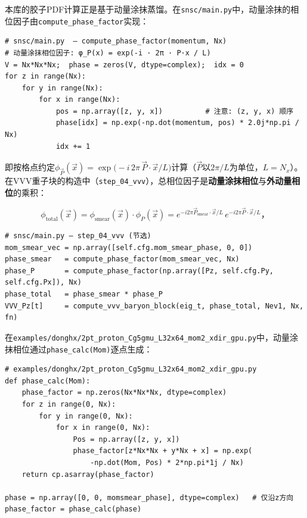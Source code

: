\documentclass[12pt,a4paper]{ctexart}
\theoremstyle{definition}
\begin{document}
本库的胶子PDF计算正是基于动量涂抹蒸馏。在\texttt{snsc/main.py}中，动量涂抹的相位因子由\texttt{compute\_phase\_factor}实现：

\begin{verbatim}
# snsc/main.py  — compute_phase_factor(momentum, Nx)
# 动量涂抹相位因子: φ_P(x) = exp(-i · 2π · P·x / L)
V = Nx*Nx*Nx;  phase = zeros(V, dtype=complex);  idx = 0
for z in range(Nx):
    for y in range(Nx):
        for x in range(Nx):
            pos = np.array([z, y, x])          # 注意: (z, y, x) 顺序
            phase[idx] = np.exp(-np.dot(momentum, pos) * 2.0j*np.pi / Nx)
            idx += 1
\end{verbatim}

即按格点约定$\phi_{\vec{P}}(\vec{x}) = \exp\!\big(-i\,2\pi\,\vec{P}\cdot\vec{x}/L\big)$计算（$\vec{P}$以$2\pi/L$为单位，$L=N_x$）。在VVV重子块的构造中（\texttt{step\_04\_vvv}），总相位因子是\textbf{动量涂抹相位}与\textbf{外动量相位}的乘积：

\begin{equation}
\phi_{\text{total}}(\vec{x}) = \phi_{\text{smear}}(\vec{x}) \cdot \phi_{P}(\vec{x})
= e^{-i 2\pi \vec{P}_{\text{smear}}\cdot\vec{x}/L}\, e^{-i 2\pi \vec{P}\cdot\vec{x}/L}，
\label{eq:phase_total}
\end{equation}

\begin{verbatim}
# snsc/main.py — step_04_vvv (节选)
mom_smear_vec = np.array([self.cfg.mom_smear_phase, 0, 0])
phase_smear   = compute_phase_factor(mom_smear_vec, Nx)
phase_P       = compute_phase_factor(np.array([Pz, self.cfg.Py, self.cfg.Px]), Nx)
phase_total   = phase_smear * phase_P
VVV_Pz[t]     = compute_vvv_baryon_block(eig_t, phase_total, Nev1, Nx, fn)
\end{verbatim}

在\texttt{examples/donghx/2pt\_proton\_Cg5gmu\_L32x64\_mom2\_xdir\_gpu.py}中，动量涂抹相位通过\texttt{phase\_calc(Mom)}逐点生成：

\begin{verbatim}
# examples/donghx/2pt_proton_Cg5gmu_L32x64_mom2_xdir_gpu.py
def phase_calc(Mom):
    phase_factor = np.zeros(Nx*Nx*Nx, dtype=complex)
    for z in range(0, Nx):
        for y in range(0, Nx):
            for x in range(0, Nx):
                Pos = np.array([z, y, x])
                phase_factor[z*Nx*Nx + y*Nx + x] = np.exp(
                    -np.dot(Mom, Pos) * 2*np.pi*1j / Nx)
    return cp.asarray(phase_factor)

phase = np.array([0, 0, momsmear_phase], dtype=complex)   # 仅沿z方向
phase_factor = phase_calc(phase)
\end{verbatim}
\end{document}

